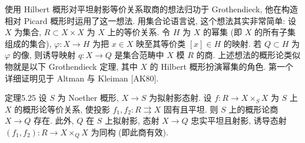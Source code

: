使用 Hilbert 概形对平坦射影等价关系取商的想法归功于 Grothendieck, 他在构造相对 Picard 概形时运用了这一想法.
用集合论语言说, 这个想法其实非常简单: 设 $X$ 为集合, $R\subset X\times X$ 为 $X$ 上的等价关系. 令 $H$ 为 $X$ 的幂集 (即 $X$ 的所有子集组成的集合), $\varphi:X\to H$ 为把 $x\in X$ 映至其等价类 $[x]\in H$ 的映射. 若 $Q\subset H$ 为 $\varphi$ 的像, 则诱导映射 $q:X\to Q$ 是集合范畴中 $X$ 模 $R$ 的商. 上述想法的概形论类似物就是以下 Grothendieck 定理, 其中 $X$ 的 Hilbert 概形扮演幂集的角色. 第一个详细证明见于 Altman 与 Kleiman [AK80].
\begin{origstatement}{定理}{5.25}\label{ch05:thm5.25}
设 $S$ 为 Noether 概形, $X\to S$ 为拟射影态射. 设 $f:R\to X\times_S X$ 为 $S$ 上 $X$ 的概形论等价关系, 使投影 $f_1,f_2:R\rightrightarrows X$ 固有且平坦. 则 $S$ 上的概形论商 $X\to Q$ 存在. 此外, $Q$ 在 $S$ 上拟射影, 态射 $X\to Q$ 忠实平坦且射影, 诱导态射 $(f_1,f_2):R\to X\times_Q X$ 为同构 (即此商有效).
\end{origstatement}
